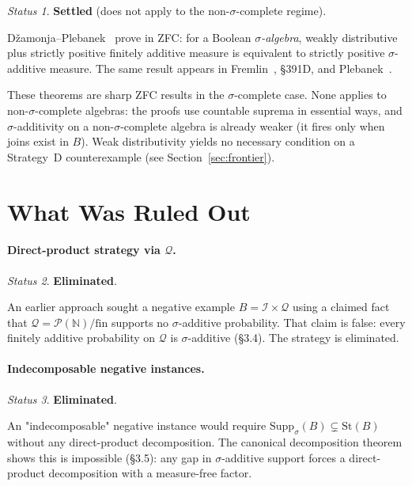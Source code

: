 \documentclass[11pt]{article}
\theoremstyle{definition}
\theoremstyle{remark}
\newtheorem*{status}{Status}
\newcommand{\N}{\mathbb{N}}
\newcommand{\St}{\mathrm{St}}
\newcommand{\Supp}{\mathrm{Supp}_\sigma}
\begin{document}
\begin{status}
\textbf{Settled} (does not apply to the non-$\sigma$-complete regime).
\end{status}

Dža\-monja--Plebanek~\cite{DzamonjaPleb2008} prove in ZFC: for a Boolean
\emph{$\sigma$-algebra}, weakly distributive plus strictly positive finitely additive
measure is equivalent to strictly positive $\sigma$-additive measure. The same
result appears in Fremlin~\cite{Fremlin2004}, \S391D, and
Plebanek~\cite{Plebanek2008}.

These theorems are sharp ZFC results in the $\sigma$-complete case. None applies
to non-$\sigma$-complete algebras: the proofs use countable suprema in essential
ways, and $\sigma$-additivity on a non-$\sigma$-complete algebra is already weaker
(it fires only when joins exist in $B$). Weak distributivity yields no necessary
condition on a Strategy~D counterexample (see Section~\ref{sec:frontier}).

\section{What Was Ruled Out}

\paragraph{Direct-product strategy via $\mathcal{Q}$.}
\begin{status}
\textbf{Eliminated}.
\end{status}
An earlier approach sought a negative example $B = \mathcal{I}\times\mathcal{Q}$
using a claimed fact that $\mathcal{Q} = \mathcal{P}(\N)/\mathrm{fin}$ supports no
$\sigma$-additive probability. That claim is false: every finitely additive
probability on $\mathcal{Q}$ is $\sigma$-additive (\S3.4). The strategy is
eliminated.

\paragraph{Indecomposable negative instances.}
\begin{status}
\textbf{Eliminated}.
\end{status}
An "indecomposable" negative instance would require $\Supp(B)\subsetneq\St(B)$
without any direct-product decomposition. The canonical decomposition theorem shows
this is impossible (\S3.5): any gap in $\sigma$-additive support forces a
direct-product decomposition with a measure-free factor.
\end{document}
